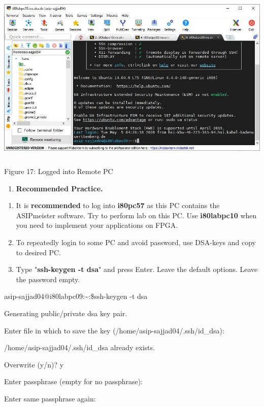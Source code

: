 \documentclass[
]{article}
\begin{document}
\includegraphics[width=5.70556in,height=3.27527in]{images/media/image17.JPG}

Figure 17: Logged into Remote PC

\begin{enumerate}
\def\labelenumi{\Alph{enumi}.}
\setcounter{enumi}{8}
\item
  \textbf{Recommended Practice.}
\end{enumerate}

\begin{enumerate}
\def\labelenumi{\arabic{enumi}.}
\setcounter{enumi}{7}
\item
  It is \textbf{recommended} to log into \textbf{i80pc57} as this PC
  contains the ASIPmeister software. Try to perform lab on this PC. Use
  \textbf{i80labpc10} when you need to implement your applications on
  FPGA.
\item
  To repeatedly login to some PC and avoid password, use DSA-keys and
  copy to desired PC.
\item
  Type "\textbf{ssh-keygen -t dsa}" and press Enter. Leave the default
  options. Leave the password empty.
\end{enumerate}

asip-sajjad04@i80labpc09:\textasciitilde:\$ssh-keygen -t dsa

Generating public/private dsa key pair.

Enter file in which to save the key (/home/asip-sajjad04/.ssh/id\_dsa):

/home/asip-sajjad04/.ssh/id\_dsa already exists.

Overwrite (y/n)? y

Enter passphrase (empty for no passphrase):

Enter same passphrase again:
\end{document}
